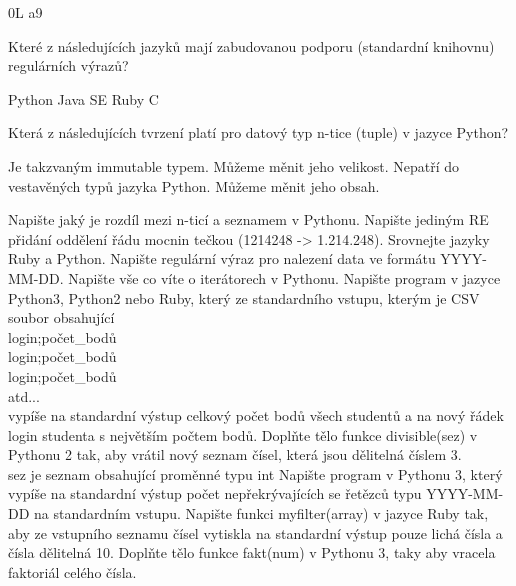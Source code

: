 \documentclass[addpoints,12pt]{exam}
\begin{document}
\begin{questions}
\begin{choices}
\choice
0L
\choice
a9
\end{choices}
\question[2]
Které z následujících jazyků mají zabudovanou podporu (standardní knihovnu) regulárních výrazů?
\nopagebreak
\begin{choices}
\choice
Python
\choice
Java SE
\choice
Ruby
\choice
C
\end{choices}
\question[2]
Která z následujících tvrzení platí pro datový typ n-tice (tuple) v jazyce Python?
\nopagebreak
\begin{choices}
\choice
Je takzvaným immutable typem.
\choice
Můžeme měnit jeho velikost.
\choice
Nepatří do vestavěných typů jazyka Python.
\choice
Můžeme měnit jeho obsah.
\end{choices}
\question[2]
Napište jaký je rozdíl mezi n-ticí a seznamem v Pythonu.
\nopagebreak
\makeemptybox{10cm}
\question[2]
Napište jediným RE přidání oddělení řádu mocnin tečkou (1214248 -\textgreater{} 1.214.248).
\nopagebreak
\makeemptybox{10cm}
\question[2]
Srovnejte jazyky Ruby a Python.
\nopagebreak
\makeemptybox{10cm}
\question[2]
Napište regulární výraz pro nalezení data ve formátu YYYY-MM-DD.
\nopagebreak
\makeemptybox{10cm}
\question[2]
Napište vše co víte o iterátorech v Pythonu.
\nopagebreak
\makeemptybox{10cm}
\question[2]
Napište program v jazyce Python3, Python2 nebo Ruby, který ze standardního vstupu, kterým je CSV soubor obsahující\\
login;počet\_{}bodů\\
login;počet\_{}bodů\\
login;počet\_{}bodů\\
atd...\\
vypíše na standardní výstup celkový počet bodů všech studentů a na nový řádek login studenta s největším počtem bodů.
\nopagebreak
\makeemptybox{10cm}
\question[2]
Doplňte tělo funkce divisible(sez) v Pythonu 2 tak, aby vrátil nový seznam čísel, která jsou dělitelná číslem 3.\\
sez je seznam obsahující proměnné typu int
\nopagebreak
\makeemptybox{10cm}
\question[2]
Napište program v Pythonu 3, který vypíše na standardní výstup počet nepřekrývajících se řetězců typu YYYY-MM-DD na standardním vstupu.
\nopagebreak
\makeemptybox{10cm}
\question[2]
Napište funkci myfilter(array) v jazyce Ruby tak, aby ze vstupního seznamu čísel vytiskla na standardní výstup pouze lichá čísla a čísla dělitelná 10.
\nopagebreak
\makeemptybox{10cm}
\question[2]
Doplňte tělo funkce fakt(num) v Pythonu 3, taky aby vracela faktoriál celého čísla.
\nopagebreak
\makeemptybox{10cm}
\question[2]

\end{questions}
\end{document}
